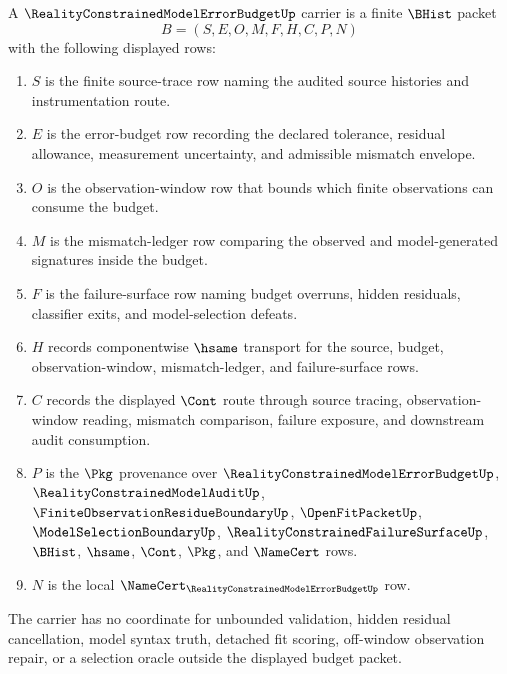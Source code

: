\begin{definition}
\label{def:reality-constrained-model-error-budget-carrier}
A $\RealityConstrainedModelErrorBudgetUp$ carrier is a finite $\BHist$ packet
$$
B=(S,E,O,M,F,H,C,P,N)
$$
with the following displayed rows:
\begin{enumerate}
\item $S$ is the finite source-trace row naming the audited source histories and instrumentation route.
\item $E$ is the error-budget row recording the declared tolerance, residual allowance, measurement uncertainty, and admissible mismatch envelope.
\item $O$ is the observation-window row that bounds which finite observations can consume the budget.
\item $M$ is the mismatch-ledger row comparing the observed and model-generated signatures inside the budget.
\item $F$ is the failure-surface row naming budget overruns, hidden residuals, classifier exits, and model-selection defeats.
\item $H$ records componentwise $\hsame$ transport for the source, budget, observation-window, mismatch-ledger, and failure-surface rows.
\item $C$ records the displayed $\Cont$ route through source tracing, observation-window reading, mismatch comparison, failure exposure, and downstream audit consumption.
\item $P$ is the $\Pkg$ provenance over $\RealityConstrainedModelErrorBudgetUp$, $\RealityConstrainedModelAuditUp$, $\FiniteObservationResidueBoundaryUp$, $\OpenFitPacketUp$, $\ModelSelectionBoundaryUp$, $\RealityConstrainedFailureSurfaceUp$, $\BHist$, $\hsame$, $\Cont$, $\Pkg$, and $\NameCert$ rows.
\item $N$ is the local $\NameCert_{\RealityConstrainedModelErrorBudgetUp}$ row.
\end{enumerate}
The carrier has no coordinate for unbounded validation, hidden residual cancellation, model syntax truth, detached fit scoring, off-window observation repair, or a selection oracle outside the displayed budget packet.
\end{definition}


